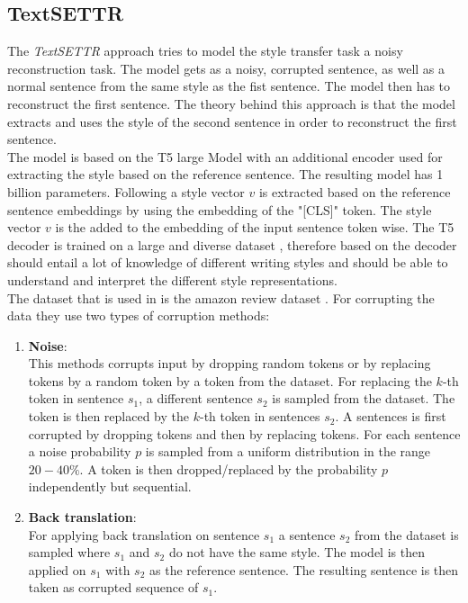 \documentclass[twocolumn]{tum-article}
\begin{document}
\subsection{TextSETTR} \label{sec:textsettr}
The \textit{TextSETTR} \cite{riley2020textsettr} approach tries to model the style transfer task a noisy reconstruction task. The model gets as a noisy, corrupted sentence, as well as a normal sentence from the same style as the fist sentence. The model then has to reconstruct the first sentence. The theory behind this approach is that the model extracts and uses the style of the second sentence in order to reconstruct the first sentence.\\
The model is based on the T5 large Model with an additional encoder used for extracting the style based on the reference sentence. The resulting model has 1 billion parameters. Following \cite{devlin-etal-2019-bert, raffel2019exploring} a style vector $v$ is extracted based on the reference sentence embeddings by using the embedding of the "[CLS]" token. The style vector $v$ is the added to the embedding of the input sentence token wise. The T5 decoder is trained on a large and diverse dataset \cite{raffel2019exploring}, therefore based on \cite{riley2020textsettr} the decoder should entail a lot of knowledge of different writing styles and should be able to understand and interpret the different style representations.\\
The dataset that is used in \cite{riley2020textsettr} is the amazon review dataset \cite{li2018delete}. For corrupting the data they use two types of corruption methods:
\begin{enumerate}
\item \textbf{Noise}:\\
This methods corrupts input by dropping random tokens or by replacing tokens by a random token by a token from the dataset. For replacing the $k$-th token in sentence $s_1$, a different sentence $s_2$ is sampled from the dataset. The token is then replaced by the $k$-th token in sentences $s_2$. A sentences is first corrupted by dropping tokens and then by replacing tokens. For each sentence a noise probability $p$ is sampled from a uniform distribution in the range $20-40\%$. A token is then dropped/replaced by the probability $p$ independently but sequential.
\item \textbf{Back translation}:\\
For applying back translation on sentence $s_1$ a sentence $s_2$ from the dataset is sampled where $s_1$ and $s_2$ do not have the same style. The model is then applied on $s_1$ with $s_2$ as the reference sentence. The resulting sentence is then taken as corrupted sequence of $s_1$. 
\end{enumerate}
\end{document}
